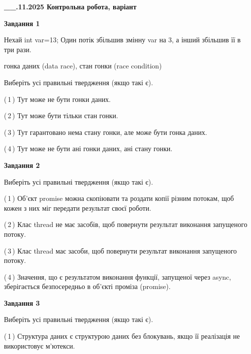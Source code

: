 \documentclass[12pt, ukrainian]{article}
\begin{document}
\begin {large}

\textbf{\_\_.11.2025 Контрольна робота, варіант  }\par


{

\begin{center}
\textbf{Завдання 1}
\end{center}
Нехай int var=13; Один потік збільшив змінну var на 3, а інший збільшив її в три рази.

гонка даних (data race), стан гонки (race condition)

Виберіть усі правильні твердження (якщо такі є).\par
\vspace{2mm}
(\,1\,) Тут може не бути гонки даних.%

(\,2\,) Тут може бути тільки стан гонки.%

(\,3\,) Тут гарантовано нема стану гонки, але може бути гонка даних.%

(\,4\,) Тут може не бути ані гонки даних, ані стану гонки.%



\begin{center}
\textbf{Завдання 2}
\end{center}
Виберіть усі правильні твердження (якщо такі є).\par
\vspace{2mm}

(\,1\,) Об’єкт promise можна скопіювати та роздати копії різним потокам, щоб кожен з них міг передати результат своєї роботи.%

(\,2\,) Клас thread не має засобів, щоб повернути результат виконання запущеного потоку.%

(\,3\,) Клас thread має засоби, щоб повернути результат виконання запущеного потоку.%

(\,4\,) Значення, що є результатом виконання функції, запущеної через async, зберігається безпосередньо в об’єкті проміза (promise).%



\begin{center}
\textbf{Завдання 3}
\end{center}
Виберіть усі правильні твердження (якщо такі є).\par
\vspace{2mm}

(\,1\,) Структура даних є структурою даних без блокувань, якщо її реалізація не використовує м’ютекси.%

}
\end{large}
\end{document}
